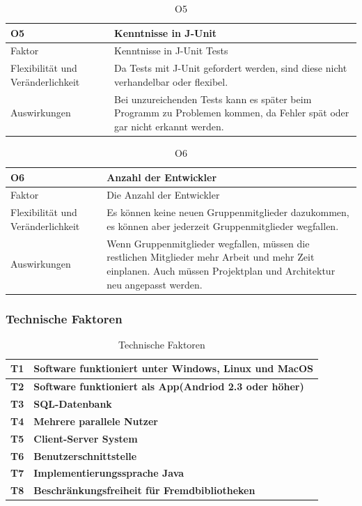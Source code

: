 \documentclass[fontsize=12pt,paper=a4,twoside]{scrartcl}
\begin{document}
\begin{table}[H]
\caption{O5}
\begin{tabular}{|p{3cm}|p{12cm}|}\hline
\textbf{O5} & \textbf{Kenntnisse in J-Unit} \\ \hline \hline
Faktor & Kenntnisse in J-Unit Tests\\ \hline
Flexibilität und Veränderlichkeit & Da Tests mit J-Unit gefordert werden, sind diese nicht verhandelbar oder flexibel.\\ \hline
Auswirkungen & Bei unzureichenden Tests kann es später beim Programm zu Problemen kommen, da Fehler spät oder gar nicht erkannt werden.\\ \hline
\end{tabular}
\end{table}

\begin{table}[H]
\caption{O6}
\begin{tabular}{|p{3cm}|p{12cm}|}\hline
\textbf{O6} & \textbf{Anzahl der Entwickler}\\ \hline \hline
Faktor & Die Anzahl der Entwickler\\ \hline
Flexibilität und Veränderlichkeit & Es können keine neuen Gruppenmitglieder dazukommen, es können aber jederzeit Gruppenmitglieder wegfallen. \\ \hline
Auswirkungen & Wenn Gruppenmitglieder wegfallen, müssen die restlichen Mitglieder mehr Arbeit und mehr Zeit einplanen. Auch müssen Projektplan und Architektur neu angepasst werden.\\ \hline
\end{tabular}
\end{table}

\subsubsection{Technische Faktoren}
\label{sec:techfaktoren}

\begin{table}[H]
\centering
\caption{Technische Faktoren}
\begin{tabular}{|l|l|} \hline
\textbf{T1} & \textbf{Software funktioniert unter Windows, Linux und MacOS} \\ \hline
\textbf{T2} & \textbf{Software funktioniert als App(Andriod 2.3 oder höher)}\\ \hline
\textbf{T3} & \textbf{SQL-Datenbank} \\ \hline
\textbf{T4} & \textbf{Mehrere parallele Nutzer} \\ \hline
\textbf{T5} & \textbf{Client-Server System} \\ \hline
\textbf{T6} & \textbf{Benutzerschnittstelle} \\ \hline
\textbf{T7} & \textbf{Implementierungssprache Java} \\ \hline
\textbf{T8} &  \textbf{Beschränkungsfreiheit für Fremdbibliotheken}\\ \hline
\end{tabular}
\end{table}
\end{document}
